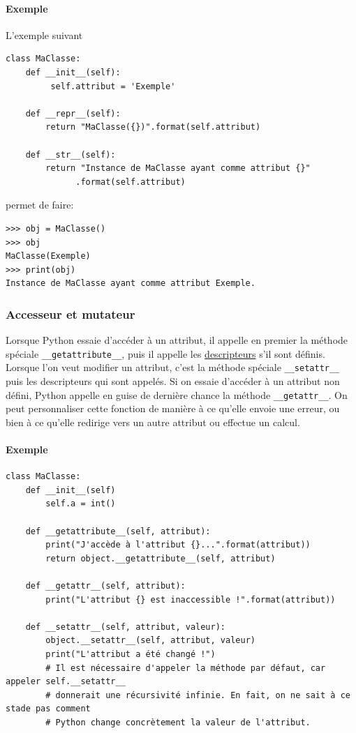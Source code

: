 \documentclass[a4paper, 10pt]{article}
\newcommand{\code}[1]{{\small\texttt{#1}}}
\begin{document}
\paragraph{Exemple} L'exemple suivant
\begin{verbatim}
class MaClasse:
    def __init__(self):
         self.attribut = 'Exemple'

    def __repr__(self):
        return "MaClasse({})".format(self.attribut)

    def __str__(self):
        return "Instance de MaClasse ayant comme attribut {}"
              .format(self.attribut)
\end{verbatim}
permet de faire:
\begin{Verbatim}[fontsize = \footnotesize, frame = single]
>>> obj = MaClasse()
>>> obj
MaClasse(Exemple)
>>> print(obj)
Instance de MaClasse ayant comme attribut Exemple.
\end{Verbatim}

\subsubsection{Accesseur et mutateur}
Lorsque Python essaie d'accéder à un attribut, il appelle en premier la méthode spéciale \code{\_\_getattribute\_\_}, puis il appelle les \hyperref[sec:proprietes]{descripteurs} s'il sont définis. Lorsque l'on veut modifier un attribut, c'est la méthode spéciale \code{\_\_setattr\_\_} puis les descripteurs qui sont appelés. Si on essaie d'accéder à un attribut non défini, Python appelle en guise de dernière chance la méthode \code{\_\_getattr\_\_}. On peut personnaliser cette fonction de manière à ce qu'elle envoie une erreur, ou bien à ce qu'elle redirige vers un autre attribut ou effectue un calcul.

\paragraph{Exemple}
\begin{verbatim}
class MaClasse:
    def __init__(self)
        self.a = int()

    def __getattribute__(self, attribut):
        print("J'accède à l'attribut {}...".format(attribut))
        return object.__getattribute__(self, attribut)

    def __getattr__(self, attribut):
        print("L'attribut {} est inaccessible !".format(attribut))

    def __setattr__(self, attribut, valeur):
        object.__setattr__(self, attribut, valeur)
        print("L'attribut a été changé !")
        # Il est nécessaire d'appeler la méthode par défaut, car appeler self.__setattr__
        # donnerait une récursivité infinie. En fait, on ne sait à ce stade pas comment
        # Python change concrètement la valeur de l'attribut.
\end{verbatim}
\end{document}

